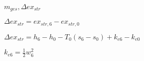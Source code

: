 \( m_{ges}, \Delta ex_{str} \)  

\( \Delta ex_{str} = ex_{str,6} - ex_{str,0} \)  

\( \Delta ex_{str} = h_6 - h_0 - T_0 (s_6 - s_0) + k_{e6} - k_{e0} \)  

\( k_{e6} = \frac{1}{2} w_6^2 \)